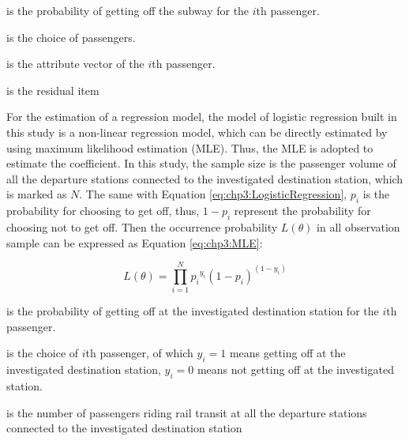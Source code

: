 \begin{description}
	\setlength{\parskip}{0\baselineskip} %
	\normalsize
	\item[\textbf{Where:}]
	\item[$p_i$] is the probability of getting off the subway for the $i$th passenger.
	\item[$y$] is the choice of passengers.
	\item[$X_i$] is the attribute vector of the $i$th passenger.
	\item[$\alpha$] is the residual item
	\setlength{\parskip}{0.7\baselineskip} %
\end{description}

%
For the estimation of a regression model, the model of logistic regression built in this study is a non-linear regression model, which can be directly estimated by using maximum likelihood estimation (MLE). Thus, the MLE is adopted to estimate the coefficient. In this study, the sample size is the passenger volume of all the departure stations connected to the investigated destination station, which is marked as $N$. The same with Equation \ref{eq:chp3:LogisticRegression}, $p_i$ is the probability for choosing to get off, thus, $1-p_i$ represent the probability for choosing not to get off. Then the occurrence probability $L(\theta)$ in all observation sample can be expressed as Equation \ref{eq:chp3:MLE}:

\begin{equation}
	L(\theta)=\prod_{i=1}^{N}{p_i}^{y_i}(1-p_i)^{(1-y_i)}
	\label{eq:chp3:MLE}
\end{equation}

\begin{description}
	\setlength{\parskip}{0\baselineskip} %
	\normalsize
	\item[\textbf{Where:}]
	\item[$p_i$] is the probability of getting off at the investigated destination station for the $i$th passenger.
	\item[$y_i$] is the choice of $i$th passenger, of which $y_i = 1$ means getting off at the investigated destination station, $y_i = 0$ means not getting off at the investigated station.
	\item[$N$] is the number of passengers riding rail transit at all the departure stations connected to the investigated destination station
	\setlength{\parskip}{0.7\baselineskip} %
\end{description}

